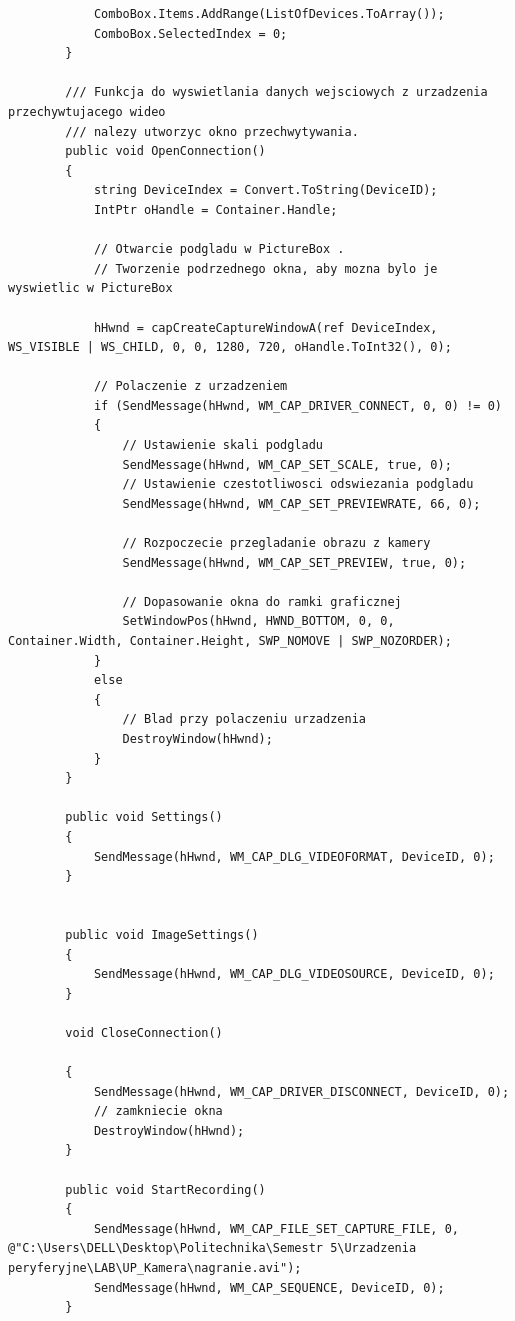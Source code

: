 \documentclass[12pt,a4paper,notitlepage]{report}
\begin{document}
\begin{adjustwidth}{0pt}{-50pt}
\begin{lstlisting}
            ComboBox.Items.AddRange(ListOfDevices.ToArray());
            ComboBox.SelectedIndex = 0;
        }

        /// Funkcja do wyswietlania danych wejsciowych z urzadzenia przechywtujacego wideo
        /// nalezy utworzyc okno przechwytywania.
        public void OpenConnection()
        {
            string DeviceIndex = Convert.ToString(DeviceID);
            IntPtr oHandle = Container.Handle;

            // Otwarcie podgladu w PictureBox .
            // Tworzenie podrzednego okna, aby mozna bylo je wyswietlic w PictureBox

            hHwnd = capCreateCaptureWindowA(ref DeviceIndex, WS_VISIBLE | WS_CHILD, 0, 0, 1280, 720, oHandle.ToInt32(), 0);

            // Polaczenie z urzadzeniem
            if (SendMessage(hHwnd, WM_CAP_DRIVER_CONNECT, 0, 0) != 0)
            {
                // Ustawienie skali podgladu
                SendMessage(hHwnd, WM_CAP_SET_SCALE, true, 0);
                // Ustawienie czestotliwosci odswiezania podgladu
                SendMessage(hHwnd, WM_CAP_SET_PREVIEWRATE, 66, 0);

                // Rozpoczecie przegladanie obrazu z kamery
                SendMessage(hHwnd, WM_CAP_SET_PREVIEW, true, 0);

                // Dopasowanie okna do ramki graficznej
                SetWindowPos(hHwnd, HWND_BOTTOM, 0, 0, Container.Width, Container.Height, SWP_NOMOVE | SWP_NOZORDER);
            }
            else
            {
                // Blad przy polaczeniu urzadzenia
                DestroyWindow(hHwnd);
            }
        }

        public void Settings()
        {
            SendMessage(hHwnd, WM_CAP_DLG_VIDEOFORMAT, DeviceID, 0);
        }


        public void ImageSettings()
        {
            SendMessage(hHwnd, WM_CAP_DLG_VIDEOSOURCE, DeviceID, 0);
        }

        void CloseConnection()

        {
            SendMessage(hHwnd, WM_CAP_DRIVER_DISCONNECT, DeviceID, 0);
            // zamkniecie okna
            DestroyWindow(hHwnd);
        }

        public void StartRecording()
        {
            SendMessage(hHwnd, WM_CAP_FILE_SET_CAPTURE_FILE, 0, @"C:\Users\DELL\Desktop\Politechnika\Semestr 5\Urzadzenia peryferyjne\LAB\UP_Kamera\nagranie.avi");
            SendMessage(hHwnd, WM_CAP_SEQUENCE, DeviceID, 0);
        }


\end{lstlisting}
\end{adjustwidth}
\end{document}
